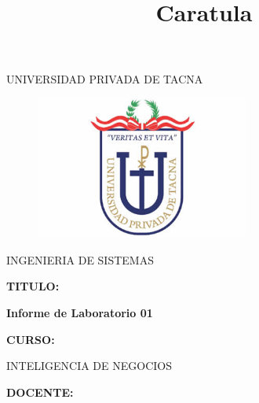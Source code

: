 \documentclass[12pt,letterpaper]{article}
\begin{document}
%


\title{Caratula}

\begin{titlepage}
\begin{center}
\large{UNIVERSIDAD PRIVADA DE TACNA}\\
\vspace*{-0.025in}
\begin{figure}[htb]
\begin{center}
\includegraphics[width=7cm]{./images/logo}
\end{center}
\end{figure}
\vspace*{0.15in}
INGENIERIA DE SISTEMAS  \\

\vspace*{0.3in}
\begin{large}
\textbf{TITULO:} \\
\end{large}

\vspace*{0.1in}
\begin{Large}
\textbf{Informe de Laboratorio 01} \\

\end{Large}

\vspace*{0.3in}
\begin{Large}
\textbf{CURSO:} \\
\end{Large}

\vspace*{0.1in}
\begin{large}
INTELIGENCIA DE NEGOCIOS\\
\end{large}

\vspace*{0.3in}
\begin{Large}
\textbf{DOCENTE:} \\
\end{Large}


\end{center}
\end{titlepage}
\end{document}
